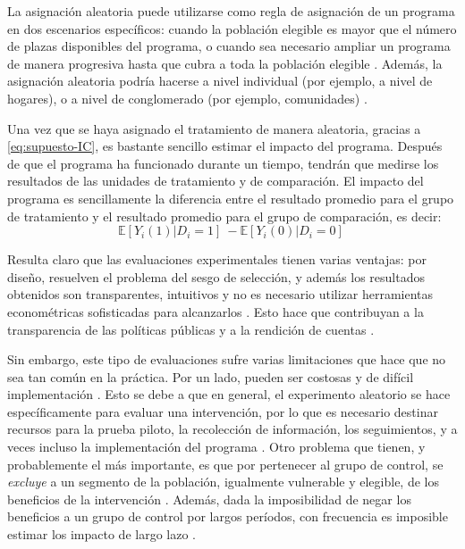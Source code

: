 \documentclass[../../main.tex]{subfiles}
\begin{document}
La asignación aleatoria puede utilizarse como regla de asignación de un programa en dos escenarios específicos: cuando la población elegible es mayor que el número de plazas disponibles del programa, o  cuando sea necesario ampliar un programa de manera progresiva hasta que cubra a toda la población elegible \cite{gertler-2016}. Además, la asignación aleatoria podría hacerse a nivel individual (por ejemplo, a nivel de hogares), o a nivel de conglomerado (por ejemplo, comunidades) \cite{bernal}.

Una vez que se haya asignado el tratamiento de manera aleatoria, gracias a \ref{eq:supuesto-IC}, es bastante sencillo estimar el impacto del programa. Después de que el programa ha funcionado durante un tiempo, tendrán que medirse los resultados de las unidades de tratamiento y de comparación. El impacto del programa es sencillamente la diferencia entre el resultado promedio para el grupo de tratamiento y el resultado promedio para el grupo de comparación, es decir:
\[
\mathbb{E} \left[Y_i(1)|D_i=1\right]\ - \mathbb{E} \left[Y_i(0)|D_i=0\right]\
\]

Resulta claro que las evaluaciones experimentales tienen varias ventajas: por diseño, resuelven el problema del sesgo de selección, y además los resultados obtenidos son transparentes, intuitivos y no es necesario utilizar herramientas econométricas sofisticadas para alcanzarlos \cite{bernal}. Esto hace que contribuyan a la transparencia de las políticas públicas y a la rendición de cuentas \cite{bernal}.

Sin embargo, este tipo de evaluaciones sufre varias limitaciones que hace que no sea tan común en la práctica. Por un lado, pueden ser costosas y de difícil implementación \cite{bernal}. Esto se debe a que en general, el experimento aleatorio se hace específicamente para evaluar una intervención, por lo que es necesario destinar recursos para la prueba piloto, la recolección de información, los seguimientos, y a veces incluso la implementación del programa \cite{bernal}. Otro problema que tienen, y probablemente el más importante, es que por pertenecer al grupo de control, se \textit{excluye} a un segmento de la población, igualmente vulnerable y elegible, de los beneficios de la intervención \cite{bernal}. Además, dada la imposibilidad de negar los beneficios a un grupo de control por largos períodos, con frecuencia es imposible estimar los impacto de largo lazo \cite{bernal}.   
\end{document}
